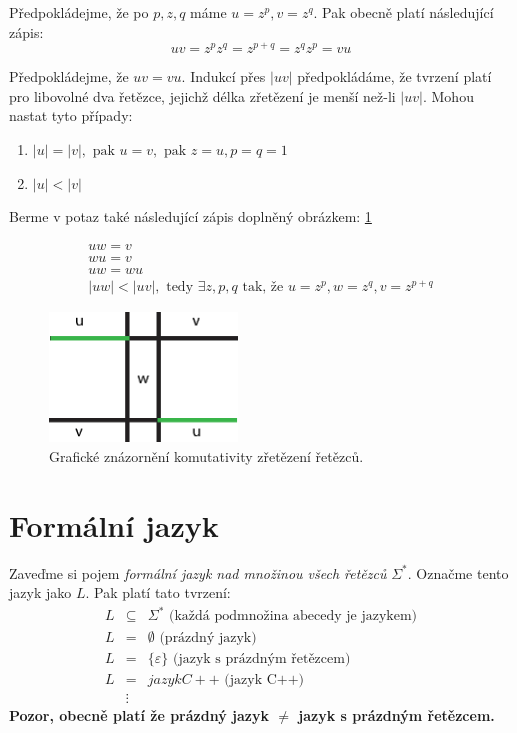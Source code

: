 \documentclass[10pt, a4paper, titlepage]{article}
\theoremstyle{note}
\begin{document}
\begin{itemize}
Předpokládejme, že po $p, z, q$ máme $u = z^{p}, v = z^{q}$. Pak obecně platí následující zápis:
$$
uv = z^{p}z^{q} = z^{p+q} = z^{q} z^{p} = vu
$$

Předpokládejme, že $uv = vu$. Indukcí přes $|uv|$ předpokládáme, že tvrzení platí pro libovolné dva řetězce, jejichž délka zřetězení je menší
než-li $|uv|$. Mohou nastat tyto případy:
\begin{enumerate}
\item
$|u| = |v|, \text{ pak } u = v, \text{ pak } z = u, p = q = 1$

\item
$|u| < |v|$
\end{enumerate}

Berme v potaz také následující zápis doplněný obrázkem: \ref{obr-1}

\begin{gather*}
uw = v \\
wu = v \\
uw = wu \\
|uw| < |uv|, \text{ tedy } \exists z, p, q  \text{ tak, že } u = z^{p}, w = z^{q}, v = z^{p+q}
\end{gather*}

\begin{figure}[ht]
\centering\includegraphics[width=5cm]{dukaz-1.eps}
\caption{Grafické znázornění komutativity zřetězení řetězců.}\label{obr-1}
\end{figure}
\end{itemize}

\section{Formální jazyk}
Zaveďme si pojem \emph{formální jazyk nad množinou všech řetězců} $\Sigma^{*}$. Označme tento jazyk jako $L$. Pak platí tato tvrzení:
\begin{eqnarray*}
L &\subseteq& \Sigma^{*} \text{ (každá podmnožina abecedy je jazykem)} \\
L &=& \emptyset \text{ (prázdný jazyk)} \\
L &=& \lbrace \varepsilon \rbrace \text{ (jazyk s prázdným řetězcem)} \\
L &=& jazyk C++ \text{ (jazyk C++)} \\
&\vdots&
\end{eqnarray*}
\textbf{Pozor, obecně platí že prázdný jazyk $\neq$ jazyk s prázdným řetězcem.}
	
\end{document}
